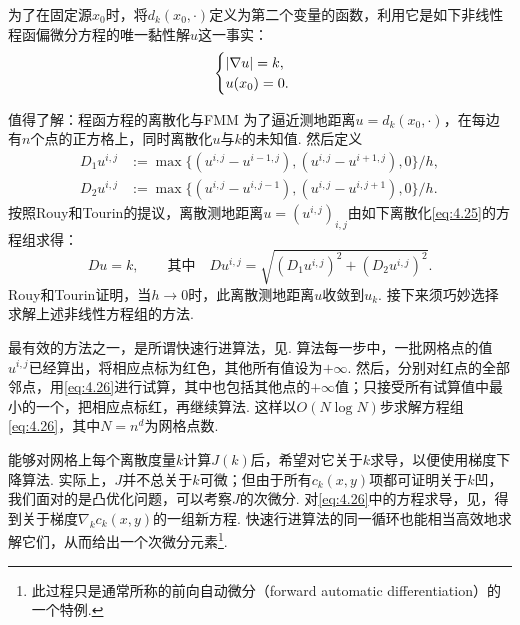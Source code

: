 为了在固定源$x_0$时，将$d_k(x_0,\cdot)$定义为第二个变量的函数，利用它是如下非线性程函偏微分方程的唯一黏性解$u$这一事实：
\begin{equation}\label{eq:4.25}\index{E050@程函方程（Eikonal equation）|hyperpage}\index{W163@加权距离（weighted distances）|hyperpage}
\begin{cases}
|\nabla u|=k,\\u(x_0)=0.
\end{cases}
\end{equation}

\begin{sourcebox}{值得了解：程函方程的离散化与FMM}\label{box:4.5}
为了逼近测地距离$u=d_k(x_0,\cdot)$，在每边有$n$个点的正方格上，同时离散化$u$与$k$的未知值. 然后定义
\begin{align*}
D_1u^{i,j}&:=\max\{(u^{i,j}-u^{i-1,j}),(u^{i,j}-u^{i+1,j}),0\}/h,\\
D_2u^{i,j}&:=\max\{(u^{i,j}-u^{i,j-1}),(u^{i,j}-u^{i,j+1}),0\}/h.
\end{align*}
按照Rouy和Tourin\cite{b267}的提议，离散测地距离$u=(u^{i,j})_{i,j}$由如下离散化\eqref{eq:4.25}的方程组求得：
\begin{equation}\label{eq:4.26}
Du=k,\qquad\text{其中}\quad
Du^{i,j}=\sqrt{(D_1u^{i,j})^2+(D_2u^{i,j})^2}.
\end{equation}
Rouy和Tourin\cite{b267}证明，当$h\to0$时，此离散测地距离$u$收敛到$u_k$. 接下来须巧妙选择求解上述非线性方程组的方法.

最有效的方法之一，是所谓快速行进算法，见\cite{b283}. 算法每一步中，一批网格点的值$u^{i,j}$已经算出，将相应点标为红色，其他所有值设为$+\infty$. 然后，分别对红点的全部邻点，用\eqref{eq:4.26}进行试算，其中也包括其他点的$+\infty$值；只接受所有试算值中最小的一个，把相应点标红，再继续算法. 这样以$O(N\log N)$步求解方程组\eqref{eq:4.26}，其中$N=n^d$为网格点数.
\end{sourcebox}

能够对网格上每个离散度量$k$计算$J(k)$后，希望对它关于$k$求导，以便使用梯度下降算法. 实际上，$J$并不总关于$k$可微；但由于所有$c_k(x,y)$项都可证明关于$k$凹，我们面对的是凸优化问题，可以考察$J$的次微分. 对\eqref{eq:4.26}中的方程求导，见\cite{b43}，得到关于梯度$\nabla_kc_k(x,y)$的一组新方程. \label{idx:root4-p159-subdifferentials}快速行进算法的同一循环也能相当高效地求解它们，从而给出一个次微分元素\footnote{此过程只是通常所称的前向自动微分（forward automatic differentiation）的一个特例.}.

